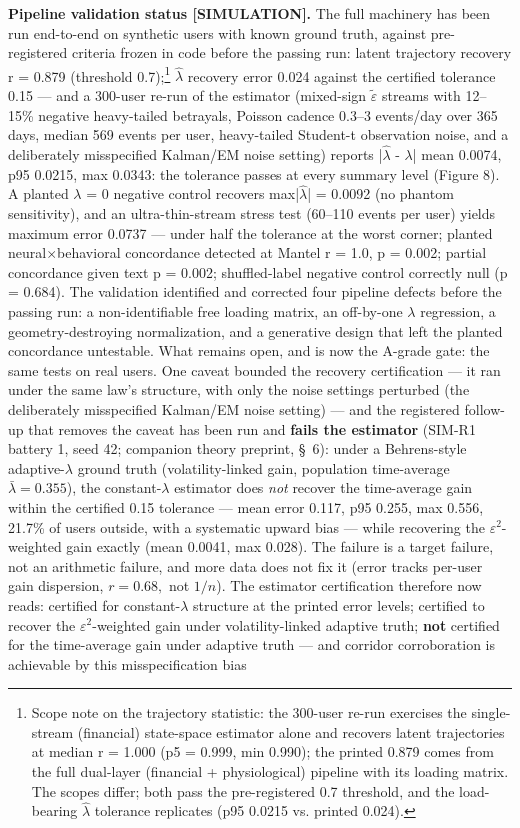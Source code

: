 \documentclass[11pt,twocolumn]{article}
\begin{document}
\textbf{Pipeline validation status [SIMULATION].} The full machinery has been run end-to-end on synthetic users with known ground truth, against pre-registered criteria frozen in code before the passing run: latent trajectory recovery r = 0.879 (threshold 0.7);\footnote{Scope note on the trajectory statistic: the 300-user re-run exercises the single-stream (financial) state-space estimator alone and recovers latent trajectories at median r = 1.000 (p5 = 0.999, min 0.990); the printed 0.879 comes from the full dual-layer (financial + physiological) pipeline with its loading matrix. The scopes differ; both pass the pre-registered 0.7 threshold, and the load-bearing $\hat{\lambda}$ tolerance replicates (p95 0.0215 vs. printed 0.024).} $\hat{\lambda}$ recovery error 0.024 against the certified tolerance 0.15 --- and a 300-user re-run of the estimator (mixed-sign $\tilde{\varepsilon}$ streams with 12--15\% negative heavy-tailed betrayals, Poisson cadence 0.3--3 events/day over 365 days, median 569 events per user, heavy-tailed Student-t observation noise, and a deliberately misspecified Kalman/EM noise setting) reports |$\hat{\lambda}$ - $\lambda$| mean 0.0074, p95 0.0215, max 0.0343: the tolerance passes at every summary level (Figure 8). A planted $\lambda$ = 0 negative control recovers max|$\hat{\lambda}$| = 0.0092 (no phantom sensitivity), and an ultra-thin-stream stress test (60--110 events per user) yields maximum error 0.0737 --- under half the tolerance at the worst corner; planted neural$\times$behavioral concordance detected at Mantel r = 1.0, p = 0.002; partial concordance given text p = 0.002; shuffled-label negative control correctly null (p = 0.684). The validation identified and corrected four pipeline defects before the passing run: a non-identifiable free loading matrix, an off-by-one $\lambda$ regression, a geometry-destroying normalization, and a generative design that left the planted concordance untestable. What remains open, and is now the A-grade gate: the same tests on real users. One caveat bounded the recovery certification --- it ran under the same law's structure, with only the noise settings perturbed (the deliberately misspecified Kalman/EM noise setting) --- and the registered follow-up that removes the caveat has been run and \textbf{fails the estimator} (SIM-R1 battery 1, seed 42; companion theory preprint, \S~6): under a Behrens-style adaptive-$\lambda$ ground truth (volatility-linked gain, population time-average $\bar{\lambda} = 0.355$), the constant-$\lambda$ estimator does \emph{not} recover the time-average gain within the certified 0.15 tolerance --- mean error 0.117, p95 0.255, max 0.556, 21.7\% of users outside, with a systematic upward bias --- while recovering the $\varepsilon^{2}$-weighted gain exactly (mean 0.0041, max 0.028). The failure is a target failure, not an arithmetic failure, and more data does not fix it (error tracks per-user gain dispersion, $r = 0.68,$ not $1/n$). The estimator certification therefore now reads: certified for constant-$\lambda$ structure at the printed error levels; certified to recover the $\varepsilon^{2}$-weighted gain under volatility-linked adaptive truth; \textbf{not} certified for the time-average gain under adaptive truth --- and corridor corroboration is achievable by this misspecification bias 
\end{document}
